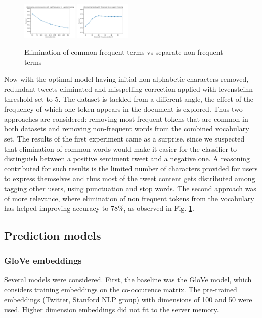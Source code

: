\documentclass[10pt,conference,compsocconf]{IEEEtran}
\begin{document}
\begin{figure}[!htb]
	\centering \includegraphics[width=100px]{../plots/commonElem.png}
	\centering \includegraphics[width=100px]{../plots/nonfrequent.png}
	\caption{Elimination of common frequent terms vs separate non-frequent terms}
	\label{freq}
\end{figure}
Now with the optimal model having initial non-alphabetic characters removed, redundant tweets eliminated and misspelling correction applied with levensteihn threshold set to 5. The dataset is tackled from a different angle, the effect of the frequency of which one token appears in the document is explored. Thus two approaches are considered: removing most frequent tokens that are common in both datasets and removing non-frequent words from the combined vocabulary set. The results of the first experiment came as a surprise, since we suspected that elimination of common words would make it easier for the classifier to distinguish between a positive sentiment tweet and a negative one. A reasoning contributed for such results is the limited number of characters provided for users to express themselves and thus most of the tweet content gets distributed among tagging other users, using punctuation and stop words. The second approach was of more relevance, where elimination of non frequent tokens from the vocabulary has helped improving accuracy to 78\%, as observed in Fig. \ref{freq}.

\subsection{Prediction models}
\subsubsection{GloVe embeddings}
Several models were considered.
First, the baseline was the GloVe \cite{glove} model, which considers training embeddings on the co-occurence matrix. The pre-trained embeddings (Twitter, Stanford NLP group) with dimensions of 100 and 50 were used. Higher dimension embeddings did not fit to the server memory.
\end{document}
